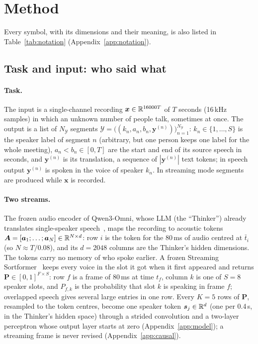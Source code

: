 \section{Method}
\label{sec:method}

Every symbol, with its dimensions and their meaning, is also listed in Table~\ref{tab:notation} (Appendix~\ref{app:notation}).



\subsection{Task and input: who said what}
\label{sec:method-task}
\label{sec:method-audio}
\label{sec:method-spk}
\label{sec:method-fuse}

\paragraph{Task.} The input is a single-channel recording $\bm{x}\in\mathbb{R}^{16000T}$ of $T$ seconds (16\,kHz samples) in
which an unknown number of people talk, sometimes at once. The output is a list of $N_\mathcal{Y}$ segments
$\mathcal{Y}=\big((k_n,a_n,b_n,\bm{y}^{(n)})\big)_{n=1}^{N_\mathcal{Y}}$: $k_n\in\{1,\dots,S\}$ is the speaker label of
segment $n$ (arbitrary, but one person keeps one label for the whole meeting), $a_n<b_n\in[0,T]$ are the start and end
of its source speech in seconds, and $\bm{y}^{(n)}$ is its translation, a sequence of $|\bm{y}^{(n)}|$ text tokens; in
speech output $\bm{y}^{(n)}$ is spoken in the voice of speaker $k_n$. In streaming mode segments are produced while
$\bm{x}$ is recorded.

\paragraph{Two streams.} The frozen audio encoder of Qwen3-Omni, whose LLM (the ``Thinker'') already translates
single-speaker speech~\citep{xu2025qwen3omni}, maps the recording to acoustic tokens
$\bm{A}=[\bm{a}_1;\dots;\bm{a}_N]\in\mathbb{R}^{N\times d}$: row $i$ is the token for the 80\,ms of audio centred at $\bar{t}_i$
(so $N\approx T/0.08$), and its $d=2048$ columns are the Thinker's hidden dimensions. The tokens carry no memory of who
spoke earlier. A frozen Streaming Sortformer~\citep{medennikov2025streaming} keeps every voice in the slot it got when
it first appeared and returns $\bm{P}\in[0,1]^{F\times S}$: row $f$ is a frame of 80\,ms at time $t_f$, column $k$ is
one of $S=8$ speaker slots, and $P_{f,k}$ is the probability that slot $k$ is speaking in frame $f$; overlapped speech
gives several large entries in one row. Every $K=5$ rows of $\bm{P}$, resampled to the token centres, become one
speaker token $\bm{s}_j\in\mathbb{R}^{d}$ (one per 0.4\,s, in the Thinker's hidden space) through a strided convolution and a
two-layer perceptron whose output layer starts at zero (Appendix~\ref{app:model}); a streaming frame is never revised
(Appendix~\ref{app:causal}).

